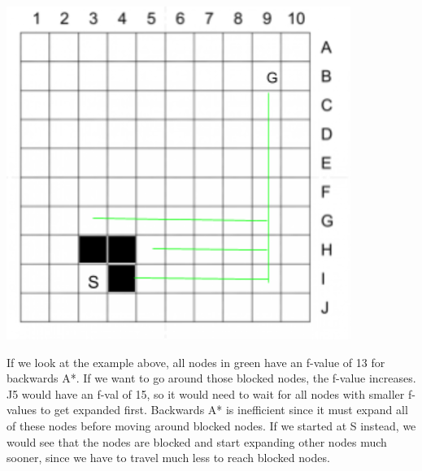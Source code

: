 \documentclass[a4paper]{article}
\theoremstyle{definition}
\theoremstyle{plain}
\begin{document}
\begin{center}
\includegraphics[scale=.6]{part3.PNG}
\end{center}

If we look at the example above, all nodes in green have an f-value of 13 for backwards A*. If we want to go around those blocked nodes, the f-value increases. J5 would have an f-val of 15, so it would need to wait for all nodes with smaller f-values to get expanded first. Backwards A* is inefficient since it must expand all of these nodes before moving around blocked nodes. If we started at S instead, we would see that the nodes are blocked and start expanding other nodes much sooner, since we have to travel much less to reach blocked nodes.
\end{document}
